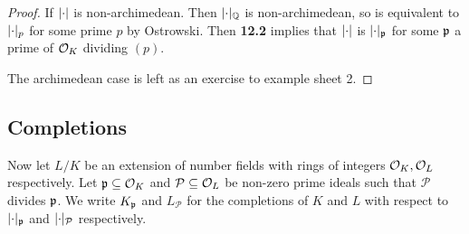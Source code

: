\documentclass[10pt,a4paper]{article}
\begin{document}
\begin{proof}
  If $\lvert\cdot\rvert$ is non-archimedean. Then $\lvert\cdot\rvert_{\mathbb{Q}}$ is non-archimedean, so is equivalent to $\lvert\cdot\rvert_p$ for some prime $p$ by Ostrowski. Then \textbf{12.2} implies that $\lvert\cdot\rvert$ is $\lvert\cdot\rvert_{\mathfrak{p}}$ for some $\mathfrak{p}$ a prime of $\mathcal{O}_K$ dividing $(p)$.

  The archimedean case is left as an exercise to example sheet 2.
\end{proof}
\subsection{Completions}
Now let $L/K$ be an extension of number fields with rings of integers $\mathcal{O}_K, \mathcal{O}_L$ respectively. Let $\mathfrak{p} \subseteq \mathcal{O}_K$ and $\mathcal{P} \subseteq \mathcal{O}_L$ be non-zero prime ideals such that $\mathcal{P}$ divides $\mathfrak{p}$. We write $K_{\mathfrak{p}}$ and $L_\mathcal{P}$ for the completions of $K$ and $L$ with respect to $\lvert\cdot\rvert_{\mathfrak{p}}$ and $\lvert\cdot\rvert_{\mathcal{P}}$ respectively.
\end{document}
